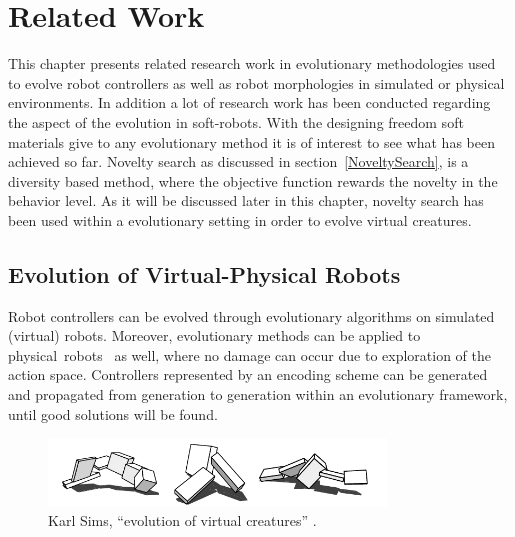 
\chapter{Related Work} %

\label{Related Work} %


This chapter presents related research work in evolutionary methodologies used to evolve robot controllers as well as robot morphologies in simulated or physical environments. In addition a lot of research work has been conducted regarding the aspect of the evolution in soft-robots. With the designing freedom soft materials give to any evolutionary method it is of interest to see what has been achieved so far. Novelty search as discussed in section~\ref{NoveltySearch}, is a diversity based method, where the objective function rewards the novelty in the behavior level. As it will be discussed later in this chapter, novelty search has been used within a evolutionary setting in order to evolve virtual creatures.


\section{Evolution of Virtual-Physical Robots}

Robot controllers can be evolved through evolutionary algorithms on simulated (virtual) robots. Moreover, evolutionary methods can be applied to physical~robots~\citep{nolfi1994evolve} as well, where no damage can occur due to exploration of the action space. Controllers represented by an encoding scheme can be generated and propagated from generation to generation within an evolutionary framework, until good solutions will be found.

\begin{figure}[b!]
\centering
\includegraphics[width=0.8\textwidth]{../Figures/Misc/evolvingVirtualCreatures.png}
\caption{Karl Sims, ``evolution of virtual creatures'' \citep{sims1994evolving}.}
\label{fig:karlSims}
\end{figure}

